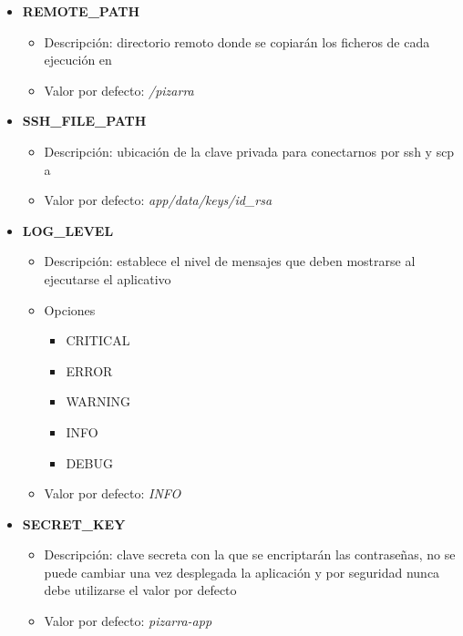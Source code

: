 \documentclass[11pt,spanish,listoffigures,listoftables]{tfgetsinf}
\begin{document}
\begin{itemize}
	\item \textbf{REMOTE\_PATH}
	\begin{itemize}
		\item Descripción: directorio remoto donde se copiarán los ficheros de cada ejecución en \kahan
		\item Valor por defecto: \textit{/pizarra}
	\end{itemize}
\end{itemize}

\begin{itemize}
	\item \textbf{SSH\_FILE\_PATH}
	\begin{itemize}
		\item Descripción: ubicación de la clave privada para conectarnos por \acrshort{ssh} y \acrshort{scp} a \kahan
		\item Valor por defecto: \textit{app/data/keys/id\_rsa}
	\end{itemize}
\end{itemize}

\begin{itemize}
	\item \textbf{LOG\_LEVEL}
	\begin{itemize}
		\item Descripción: establece el nivel de mensajes que deben mostrarse al ejecutarse el aplicativo
		\item Opciones
		\begin{itemize}
			\item CRITICAL
			\item ERROR
			\item WARNING
			\item INFO
			\item DEBUG
		\end{itemize}
		\item Valor por defecto: \textit{INFO}
	\end{itemize}
\end{itemize}

\begin{itemize}
	\item \textbf{SECRET\_KEY}
	\begin{itemize}
		\item Descripción: clave secreta con la que se encriptarán las contraseñas, no se puede cambiar una vez desplegada la aplicación y por seguridad nunca debe utilizarse el valor por defecto
		\item Valor por defecto: \textit{pizarra-app}
	\end{itemize}
\end{itemize}
\end{document}
